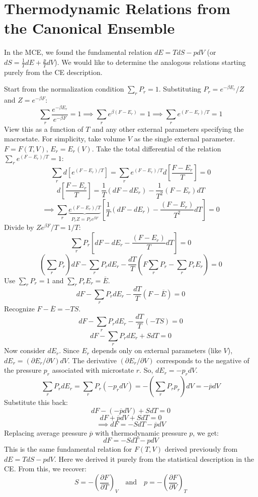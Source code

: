 \documentclass[11pt]{article}
\newcommand{\avg}[1]{\overline{#1}}
\newcommand{\pderiv}[2]{\frac{\partial #1}{\partial #2}}
\begin{document}
\section*{Thermodynamic Relations from the Canonical Ensemble}

In the MCE, we found the fundamental relation $dE = T dS - p dV$ (or $dS = \frac{1}{T}dE + \frac{p}{T}dV$). We would like to determine the analogous relations starting purely from the CE description.

Start from the normalization condition $\sum_r P_r = 1$. Substituting $P_r = e^{-\beta E_r}/Z$ and $Z = e^{-\beta F}$:
\[ \sum_r \frac{e^{-\beta E_r}}{e^{-\beta F}} = 1 \implies \sum_r e^{\beta(F-E_r)} = 1 \implies \sum_r e^{(F-E_r)/T} = 1 \]
View this as a function of $T$ and any other external parameters specifying the macrostate. For simplicity, take volume $V$ as the single external parameter. $F=F(T,V)$, $E_r = E_r(V)$.
Take the total differential of the relation $\sum_r e^{(F-E_r)/T} = 1$:
\[ \sum_r d \left[ e^{(F-E_r)/T} \right] = \sum_r e^{(F-E_r)/T} d \left[ \frac{F-E_r}{T} \right] = 0 \]
\[ d \left[ \frac{F-E_r}{T} \right] = \frac{1}{T} (dF - dE_r) - \frac{1}{T^2} (F-E_r) dT \]
\[ \implies \sum_r \underbrace{e^{(F-E_r)/T}}_{P_r Z = P_r e^{\beta F}} \left[ \frac{1}{T}(dF - dE_r) - \frac{(F-E_r)}{T^2} dT \right] = 0 \]
Divide by $Z e^{\beta F} / T = 1/T$:
\[ \sum_r P_r \left[ dF - dE_r - \frac{(F-E_r)}{T} dT \right] = 0 \]
\[ (\sum_r P_r) dF - \sum_r P_r dE_r - \frac{dT}{T} \left( F \sum_r P_r - \sum_r P_r E_r \right) = 0 \]
Use $\sum_r P_r = 1$ and $\sum_r P_r E_r = \avg{E}$.
\[ dF - \sum_r P_r dE_r - \frac{dT}{T} (F - \avg{E}) = 0 \]
Recognize $F - \avg{E} = -TS$.
\[ dF - \sum_r P_r dE_r - \frac{dT}{T} (-TS) = 0 \]
\[ dF - \sum_r P_r dE_r + S dT = 0 \]
Now consider $dE_r$. Since $E_r$ depends only on external parameters (like $V$), $dE_r = (\partial E_r / \partial V) dV$. The derivative $(\partial E_r / \partial V)$ corresponds to the negative of the pressure $p_r$ associated with microstate $r$. So, $dE_r = -p_r dV$.
\[ \sum_r P_r dE_r = \sum_r P_r (-p_r dV) = - (\sum_r P_r p_r) dV = -\avg{p} dV \]
Substitute this back:
\[ dF - (-\avg{p} dV) + S dT = 0 \]
\[ dF + \avg{p} dV + S dT = 0 \]
\[ \implies dF = -S dT - \avg{p} dV \]
Replacing average pressure $\avg{p}$ with thermodynamic pressure $p$, we get:
\[ dF = -S dT - p dV \]
This is the same fundamental relation for $F(T,V)$ derived previously from $dE=TdS-pdV$. Here we derived it purely from the statistical description in the CE.
From this, we recover:
\[ S = -\left(\pderiv{F}{T}\right)_V \quad \text{and} \quad p = -\left(\pderiv{F}{V}\right)_T \]
\end{document}
